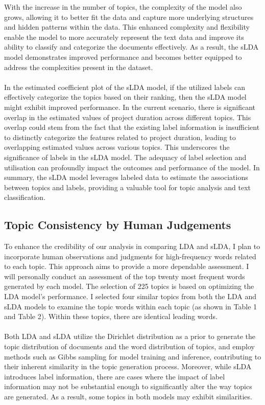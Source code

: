 \documentclass[12pt,twoside]{article}
\begin{document}
With the increase in the number of topics, the complexity of the model also grows, allowing it to better fit the data and capture more underlying structures and hidden patterns within the data. This enhanced complexity and flexibility enable the model to more accurately represent the text data and improve its ability to classify and categorize the documents effectively. As a result, the sLDA model demonstrates improved performance and becomes better equipped to address the complexities present in the dataset.\\\\

In the estimated coefficient plot of the sLDA model, if the utilized labels can effectively categorize the topics based on their ranking, then the sLDA model might exhibit improved performance. In the current scenario, there is significant overlap in the estimated values of project duration across different topics. This overlap could stem from the fact that the existing label information is insufficient to distinctly categorize the features related to project duration, leading to overlapping estimated values across various topics. This underscores the significance of labels in the sLDA model. The adequacy of label selection and utilisation can profoundly impact the outcomes and performance of the model. In summary, the sLDA model leverages labeled data to estimate the associations between topics and labels, providing a valuable tool for topic analysis and text classification.

\subsection{Topic Consistency by Human Judgements}
To enhance the credibility of our analysis in comparing LDA and sLDA, I
plan to incorporate human observations and judgments for high-frequency words related to each topic. This approach aims to provide a more dependable assessment. I will personally conduct an assessment of the top twenty most frequent words generated by each model. The selection of 225 topics is based on optimizing the LDA model's performance. I selected four similar topics from both the LDA and sLDA models to examine the topic words within each topic (as shown in Table 1 and Table 2). Within these topics, there are identical leading words.\\\\

Both LDA and sLDA utilize the Dirichlet distribution as a prior to generate the topic distribution of documents and the word distribution of topics, and employ methods such as Gibbs sampling for model training and inference, contributing to their inherent similarity in the topic generation process. Moreover, while sLDA introduces label information, there are cases where the impact of label information may not be substantial enough to significantly alter the way topics are generated. As a result, some topics in both models may exhibit similarities.\\\\
\end{document}

